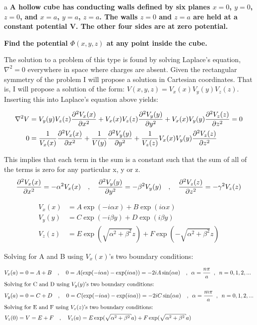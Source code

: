 \begin{homeworkProblem}

\begin{homeworkSection}{a}
\textbf{A hollow cube has conducting walls defined by six planes $x = 0$, $y = 0$, $z = 0$, and 
$x = a$, $y = a$, $z = a$. The walls $z = 0$ and $z = a$ are held at a constant potential V. 
The other four sides are at zero potential.}

\textbf{Find the potential $\Phi(x, y, z)$ at any point inside the cube.}

The solution to a problem of this type is found by solving Laplace's equation, $\nabla^2 = 0$ everywhere in space where charges are absent. Given the rectangular symmetry of the problem I will propose a solution in Cartesian coordinates. That is, I will propose a solution of the form: $V(x,y,z) = V_x(x)V_y(y)V_z(z)$. Inserting this into Laplace's equation above yields:

\begin{align}
\nabla^2 V &= V_y(y)V_z(z)\dfrac{\partial^2 {V_x(x)}}{\partial {x}^2} + V_x(x)V_z(z)\dfrac{\partial^2 {V_y(y)}}{\partial {y}^2} + V_x(x)V_y(y)\dfrac{\partial^2 {V_z(z)}}{\partial {z}^2} = 0 \nonumber \\
0 &= \dfrac{1}{V_x(x)}\dfrac{\partial^2 {V_x(x)}}{\partial {x}^2} + \dfrac{1}{V(y)}\dfrac{\partial^2 {V_y(y)}}{\partial {y}^2} + \dfrac{1}{V_z(z)}V_x(x)V_y(y)\dfrac{\partial^2 {V_z(z)}}{\partial {z}^2} \nonumber
\end{align}

This implies that each term in the sum is a constant such that the sum of all of the terms is zero for any particular x, y or z.
\[
\dfrac{\partial^2 {V_x(x)}}{\partial {x}^2} = -\alpha^2 V_x(x) \quad,\quad \dfrac{\partial^2 {V_y(y)}}{\partial {y}^2} = -\beta^2 V_y(y) \quad,\quad \dfrac{\partial^2 {V_z(z)}}{\partial {z}^2} = -\gamma^2 V_z(z) \nonumber
\]

\begin{align}
V_x(x) &= A \exp(-i \alpha x) + B \exp(i \alpha x) \nonumber \\
V_y(y) &= C \exp(-i \beta y) + D \exp(i \beta y) \nonumber \\
V_z(z) &= E \exp(\sqrt{\alpha^2+\beta^2} z) + F \exp(-\sqrt{\alpha^2+\beta^2} z) \nonumber
\end{align}

Solving for A and B using $V_x(x)$'s two boundary conditions:

\begin{align}
V_x(a) &= 0 = A + B \quad,\quad 0 = A (\exp(-i \alpha a) - \exp(i \alpha a)) = -2iA \sin(\alpha a) \quad,\enskip \alpha = \frac{n\pi}{a}\enskip,\enskip n=0,1,2,... \nonumber \\
\intertext{Solving for C and D using $V_y(y)$'s two boundary conditions:} \nonumber 
V_y(a) &= 0 = C + D \quad,\quad 0 = C (\exp(-i \alpha a) - \exp(i \alpha a)) = -2iC \sin(\alpha a) \quad,\enskip \alpha = \frac{m\pi}{a}\enskip,\enskip n=0,1,2,... \nonumber \\
\intertext{Solving for E and F using $V_z(z)$'s two boundary conditions:} \nonumber 
V_z(0) &= V = E + F \quad,\quad V_z(a) = E \exp(\sqrt{\alpha^2+\beta^2} a) + F \exp(\sqrt{\alpha^2+\beta^2} a) \nonumber
\end{align}


\end{homeworkSection}
\end{homeworkProblem}
